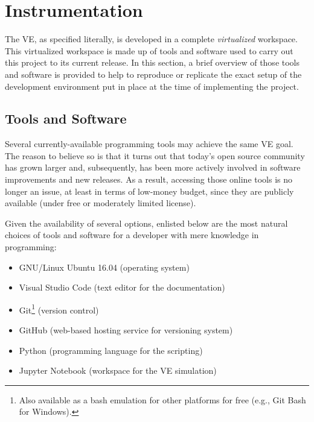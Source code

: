 %
%
%
%


\section{Instrumentation}
The VE, as specified literally, is developed in a complete \emph{virtualized} workspace. This virtualized workspace is made up of tools and software used to carry out this project to its current release. In this section, a brief overview of those tools and software is provided to help to reproduce or replicate the exact setup of the development environment put in place at the time of implementing the project.

\subsection{Tools and Software}
Several currently-available programming tools may achieve the same VE goal. The reason to believe so is that it turns out that today's open source community has grown larger and, subsequently, has been more actively involved in software improvements and new releases. As a result, accessing those online tools is no longer an issue, at least in terms of low-money budget, since they are publicly available (under free or moderately limited license).

Given the availability of several options, enlisted below are the most natural choices of  tools and software for a developer with mere knowledge in programming:
\begin{itemize}
    \item GNU/Linux Ubuntu 16.04 (operating system)
    \item Visual Studio Code (text editor for the documentation)
    \item Git\footnote{Also available as a bash emulation for other platforms for free (e.g., Git Bash for Windows).} (version control)
    \item GitHub (web-based hosting service for versioning system)
    \item Python (programming language for the scripting)
    \item Jupyter Notebook (workspace for the VE simulation)
\end{itemize}

